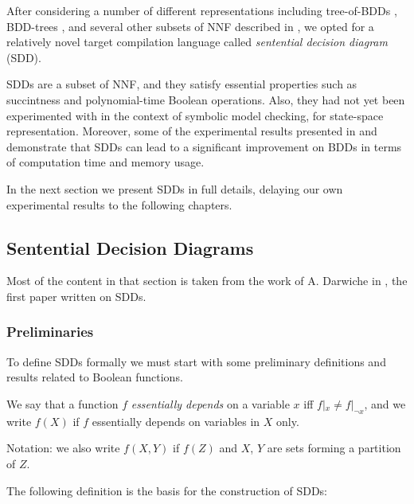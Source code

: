 \documentclass[11pt]{article}
\newenvironment{definition}[1][Definition]{\begin{trivlist}
\item[\hskip \labelsep {\bfseries #1}]}{\end{trivlist}}
\begin{document}
After considering a number of different representations including tree-of-BDDs \cite{trees_of_bdds}, BDD-trees \cite{bdd_trees}, and several other subsets of NNF described in \cite{compilation_map}, we opted for a relatively novel target compilation language called \textit{sentential decision diagram} (SDD). 

SDDs are a subset of NNF, and they satisfy essential properties such as succintness and polynomial-time Boolean operations. Also, they had not yet been experimented with in the context of symbolic model checking, for state-space representation. 
Moreover, some of the experimental results presented in \cite{sdd_1} and \cite{sdd_3} demonstrate that SDDs can lead to a significant improvement on BDDs in terms of computation time and memory usage. 

In the next section we present SDDs in full details, delaying our own experimental results to the following chapters.


\subsection{Sentential Decision Diagrams}

Most of the content in that section is taken from the work of A. Darwiche in \cite{sdd_1}, the first paper written on SDDs. 

\subsubsection{Preliminaries}

To define SDDs formally we must start with some preliminary definitions and results related to Boolean functions. 

\begin{definition} 
We say that a function $f$ \textit{essentially depends} on a variable $x$ iff $f|_{x} \neq f|_{\lnot x}$, and we write $f(X)$ if $f$ essentially depends on variables in $X$ only.
\end{definition}

\noindent Notation: we also write $f(X, Y)$ if $f(Z)$ and $X$, $Y$ are sets forming a partition of $Z$.

The following definition is the basis for the construction of SDDs:
\end{document}
